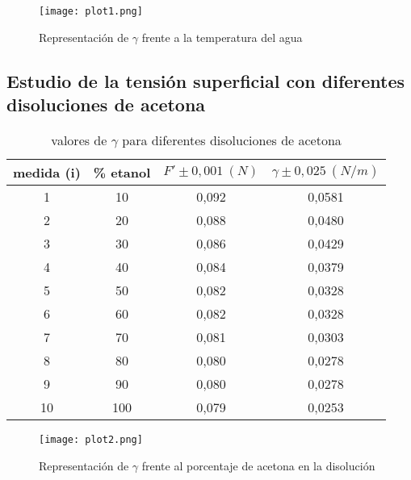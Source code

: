 \documentclass[10pt,a4paper]{article}
\begin{document}
\begin{figure}[h!]
\centering
\texttt{[image: plot1.png]}
\caption{Representación de $\gamma$ frente a la temperatura del agua}
\label{fig:plot1}
\end{figure}

\newpage

\subsection{Estudio de la tensión superficial con diferentes disoluciones de acetona}
\begin{table}[h] %
\begin{center}
\begin{tabular}{|c|c|c|c|}
\hline
medida (i) & 	 \% etanol & 	 $F' \pm 0,001  \ (N)$ & 	 $\gamma \pm 0,025 \ (N/m) $ \\ \hline
1 & 	 10 & 	 0,092 & 	 0,0581 \\ 
2 & 	 20 & 	 0,088 & 	 0,0480 \\ 
3 & 	 30 & 	 0,086 & 	 0,0429 \\ 
4 & 	 40 & 	 0,084 & 	 0,0379 \\ 
5 & 	 50 & 	 0,082 & 	 0,0328 \\ 
6 & 	 60 & 	 0,082 & 	 0,0328 \\ 
7 & 	 70 & 	 0,081 & 	 0,0303 \\ 
8 & 	 80 & 	 0,080 & 	 0,0278 \\ 
9 & 	 90 & 	 0,080 & 	 0,0278 \\ 
10 & 	 100 & 	 0,079 & 	 0,0253 \\ 

\hline

\end{tabular}
\caption{valores de $\gamma$ para diferentes disoluciones de acetona}

\label{tab:F' vs acetona}
\end{center}
\end{table}

\begin{figure}[h]
\centering
\texttt{[image: plot2.png]}
\caption{Representación de $\gamma$ frente al porcentaje de acetona en la disolución}
\label{fig:plot2}
\end{figure}
\end{document}
